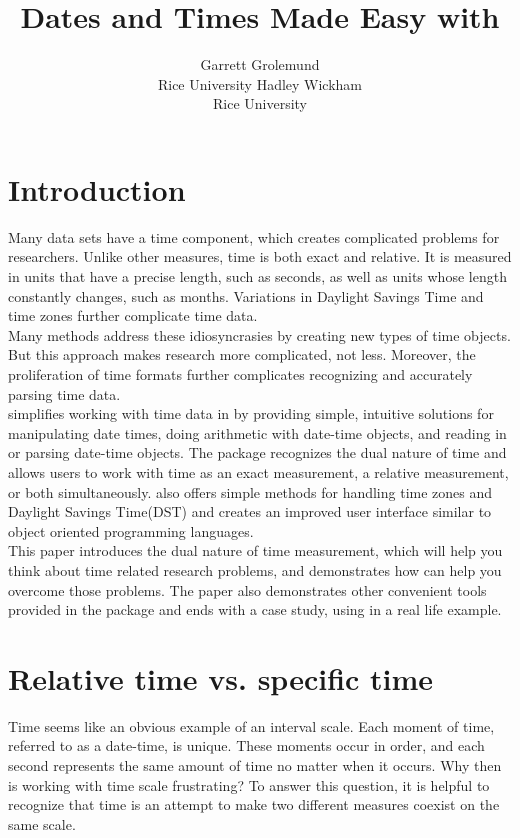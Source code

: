 \documentclass[article]{jss}
\author{Garrett Grolemund\\Rice University \And 
        Hadley Wickham\\Rice University}
\title{Dates and Times Made Easy with \pkg{lubridate}}
\begin{document}
\section{Introduction}
Many data sets have a time component, which creates complicated problems for researchers. Unlike other measures, time is both exact and relative.  It is measured in units that have a precise length, such as seconds, as well as units whose length constantly changes, such as months. Variations in Daylight Savings Time and time zones further complicate time data.\\

Many  methods address these idiosyncrasies by creating new types of time objects.  But this approach makes research more complicated, not less. Moreover, the proliferation of time formats further complicates recognizing and accurately parsing time data.\\

 simplifies working with time data in  by providing simple, intuitive solutions for manipulating date times, doing arithmetic with date-time objects, and reading in or parsing date-time objects. The package recognizes the dual nature of time and allows users to work with time as an exact measurement, a relative measurement, or both simultaneously.  also offers simple methods for handling time zones and Daylight Savings Time(DST) and creates an improved user interface similar to object oriented programming languages.\\

This paper introduces the dual nature of time measurement, which will help you think about time related research problems, and demonstrates how  can help you overcome those problems. The paper also demonstrates other convenient tools provided in the  package and ends with a case study, using  in a real life example.\\

\section{Relative time vs. specific time}
Time seems like an obvious example of an interval scale. Each moment of time, referred to as a date-time, is unique.  These moments occur in order, and each second represents the same amount of time no matter when it occurs.  Why then is working with time scale frustrating? To answer this question, it is helpful to recognize that time is an attempt to make two different measures coexist on the same scale. \\
\end{document}
